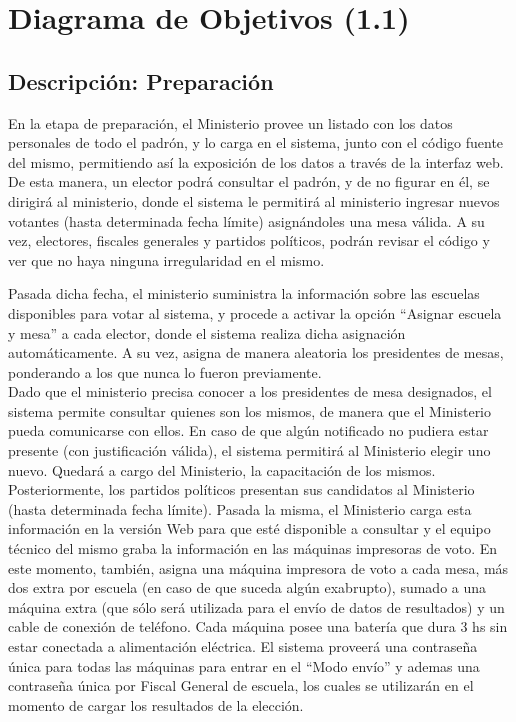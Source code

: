 \section{Diagrama de Objetivos (1.1)}

\subsection{Descripci\'on: Preparación}

En la etapa de preparación, el Ministerio provee un listado con los datos personales de todo el padrón, y lo carga en el sistema, junto con el código fuente del mismo, permitiendo así la exposición de los datos a través de la interfaz web. De esta manera, un elector podrá consultar el padrón, y de no figurar en él, se dirigirá al ministerio, donde el sistema le permitirá al ministerio ingresar nuevos votantes  (hasta determinada fecha límite) asignándoles una mesa válida. A su vez, electores, fiscales generales y partidos políticos, podrán revisar el código y ver que no haya ninguna irregularidad en el mismo.

Pasada dicha fecha, el ministerio suministra la información sobre las escuelas disponibles para votar al sistema, y procede a activar la opción “Asignar escuela y mesa” a cada elector, donde el sistema realiza dicha asignación automáticamente. A su vez, asigna de manera aleatoria los presidentes de mesas, ponderando a los que nunca lo fueron previamente.\\

Dado que el ministerio precisa conocer a los presidentes de mesa designados, el sistema permite consultar quienes son los mismos, de manera que el Ministerio pueda comunicarse con ellos. En caso de que algún notificado no pudiera estar presente (con justificación válida), el sistema permitirá al Ministerio elegir uno nuevo. Quedará a cargo del Ministerio, la capacitación de los mismos.\\

Posteriormente, los partidos políticos presentan sus candidatos al Ministerio (hasta determinada fecha límite). Pasada la misma, el Ministerio carga esta información en la versión Web para que esté disponible a consultar y el equipo técnico del mismo graba la información en las máquinas impresoras de voto. En este momento, también, asigna una máquina impresora de voto a cada mesa, más dos extra por escuela (en caso de que suceda algún exabrupto), sumado a una máquina extra (que sólo será utilizada para el envío de datos de resultados) y un cable de conexión de teléfono. Cada máquina posee una batería que dura 3 hs sin estar conectada a alimentación eléctrica. El sistema proveerá una contraseña única para todas las máquinas para entrar en el “Modo envío” y ademas una contraseña única por Fiscal General de escuela, los cuales se utilizarán en el momento de cargar los resultados de la elección.\\

